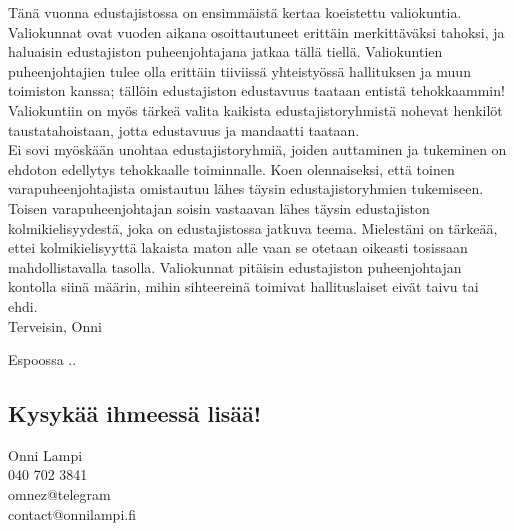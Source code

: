\documentclass[a4paper, 12pt, finnish]{report}
\newcommand*{\findate}{\the\day.\the\month.\the\year}
\begin{document}
Tänä vuonna edustajistossa on ensimmäistä kertaa koeistettu valiokuntia.
Valiokunnat ovat vuoden aikana osoittautuneet erittäin merkittäväksi tahoksi, ja haluaisin edustajiston puheenjohtajana jatkaa tällä tiellä.
Valiokuntien puheenjohtajien tulee olla erittäin tiiviissä yhteistyössä hallituksen ja muun toimiston kanssa; tällöin edustajiston edustavuus taataan entistä tehokkaammin!
Valiokuntiin on myös tärkeä valita kaikista edustajistoryhmistä nohevat henkilöt taustatahoistaan, jotta edustavuus ja mandaatti taataan.\\

Ei sovi myöskään unohtaa edustajistoryhmiä, joiden auttaminen ja tukeminen on ehdoton edellytys tehokkaalle toiminnalle.
Koen olennaiseksi, että toinen varapuheenjohtajista omistautuu lähes täysin edustajistoryhmien tukemiseen.
Toisen varapuheenjohtajan soisin vastaavan lähes täysin edustajiston kolmikielisyydestä, joka on edustajistossa jatkuva teema.
Mielestäni on tärkeää, ettei kolmikielisyyttä lakaista maton alle vaan se otetaan oikeasti tosissaan mahdollistavalla tasolla.
Valiokunnat pitäisin edustajiston puheenjohtajan kontolla siinä määrin, mihin sihteereinä toimivat hallituslaiset eivät taivu tai ehdi.\\


Terveisin, Onni

Espoossa \findate

\subsection*{Kysykää ihmeessä lisää!}
Onni Lampi\\
040 702 3841\\
omnez@telegram\\
contact@onnilampi.fi
\end{document}
